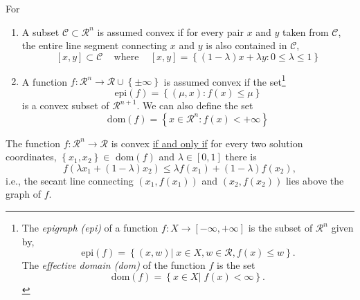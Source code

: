 \begin{enumerate}[i)]
\begin{defn} For
   \begin{enumerate}
       \item A subset $\mathcal{C}\subset\mathcal{R}^{n}$ is assumed convex if for every pair $x$ and $y$ taken from $\mathcal{C}$, the entire line segment connecting $x$ and $y$ is also contained in $\mathcal{C}$,
           \begin{displaymath}
              \left[x,y\right]\subset\mathcal{C}\;\;\;\text{ where }\;\;\; \left[x,y\right]=\left\{\left(1-\lambda\right)x +\lambda y : 0\le\lambda\le 1\right\}
           \end{displaymath}
       \item A function $f:\mathcal{R}^{n}\rightarrow \mathcal{R}\cup\left\{\pm\infty\right\}$ is assumed convex if the set\footnote{The {\it epigraph (epi)} of a function $f:X\rightarrow\left[-\infty,+\infty\right]$ is the subset of $\mathcal{R}^{n}$ given by,
            \begin{displaymath}
                \text{epi}(f) = \left\{\left(x,w\right)\left|\; x\in X,w\in\mathcal{R}, f(x) \le w\right.\right\}.
            \end{displaymath}
          The {\it effective domain (dom)} of the function $f$ is the set
            \begin{displaymath}
                \text{dom}(f) = \left\{x\in X \left|\; f(x) < \infty\right.\right\}.
            \end{displaymath}
           } 
           \begin{displaymath}
              \text{epi}(f) = \left\{\left(\mu,x\right): f(x)\le \mu\right\}
           \end{displaymath}
           is a convex subset of $\mathcal{R}^{n+1}$. We can also define the set 
           \begin{displaymath}
              \text{dom}(f) = \left\{x\in\mathcal{R}^{n} : f(x) < +\infty\right\}
           \end{displaymath}
   \end{enumerate}
\end{defn}

\begin{lem}
    The function $f : \mathcal{R}^{n}\rightarrow\mathcal{R}$ is convex \underline{if and only if} for every two solution coordinates, $\left\{x_{1},x_{2}\right\}\in\text{ dom}(f)$ and $\lambda\in\left[0,1\right]$ there is
       \begin{displaymath}
          f\left(\lambda x_{1} +\left(1-\lambda\right)x_{2}\right) \le \lambda f\left(x_{1}\right) + \left(1 - \lambda\right)f\left(x_{2}\right),
       \end{displaymath}
i.e., the secant line connecting $\left(x_{1},f\left(x_{1}\right)\right)$ and $\left(x_{2},f\left(x_{2}\right)\right)$ lies above the graph of $f$.
\end{lem}



\end{enumerate}
